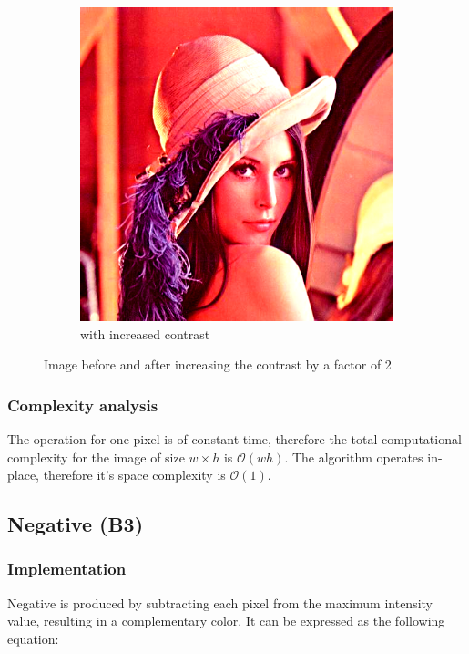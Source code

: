 \documentclass[12pt]{article}
\theoremstyle{definition}
\newcommand{\subfiguresize}{.3\textwidth}
\begin{document}
\begin{figure}[H]
\begin{subfigure}[t]{\subfiguresize}
        \includegraphics[width=\textwidth]{lenac_contrast_2x.png}
        \caption{with increased contrast}
    \end{subfigure}
    \caption{Image before and after increasing the contrast by a factor of 2}
\end{figure}

\subsubsection{Complexity analysis}

The operation for one pixel is of constant time,
therefore the total computational complexity for the image of size $w \times h$ is $\mathcal{O}(wh)$.
The algorithm operates in-place, therefore it's space complexity is $\mathcal{O}(1)$.

\vspace{5em}
\pagebreak[3]
\subsection{Negative (B3)}

\subsubsection{Implementation}

Negative is produced by subtracting each pixel from the maximum intensity value, resulting in a complementary color.
It can be expressed as the following equation:
\end{document}
